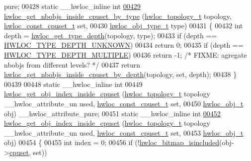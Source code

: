 \begin{DoxyCode}
      pure;
00428 \textcolor{keyword}{static} \_\_hwloc\_inline \textcolor{keywordtype}{int}
\hypertarget{a00031_source_l00429}{}\hyperlink{a00054_ga63481874c69ed257b1a0c03e7615ff97}{00429} \hyperlink{a00054_ga63481874c69ed257b1a0c03e7615ff97}{hwloc_get_nbobjs_inside_cpuset_by_type} (\hyperlink{a00039_ga9d1e76ee15a7dee158b786c30b6a6e38}{hwloc_topology_t} topology, 
      \hyperlink{a00040_ga1f784433e9b606261f62d1134f6a3b25}{hwloc_const_cpuset_t} \textcolor{keyword}{set},
00430                                         \hyperlink{a00041_gacd37bb612667dc437d66bfb175a8dc55}{hwloc_obj_type_t} type)
00431 \{
00432   \textcolor{keywordtype}{int} depth = \hyperlink{a00046_gaea7c64dd59467f5201ba87712710b14d}{hwloc_get_type_depth}(topology, type);
00433   \textcolor{keywordflow}{if} (depth == \hyperlink{a00046_ggaf4e663cf42bbe20756b849c6293ef575a0565ab92ab72cb0cec91e23003294aad}{HWLOC_TYPE_DEPTH_UNKNOWN})
00434     \textcolor{keywordflow}{return} 0;
00435   \textcolor{keywordflow}{if} (depth == \hyperlink{a00046_ggaf4e663cf42bbe20756b849c6293ef575ae99465995cacde6c210d5fc2e409798c}{HWLOC_TYPE_DEPTH_MULTIPLE})
00436     \textcolor{keywordflow}{return} -1; \textcolor{comment}{/* FIXME: agregate nbobjs from different levels? */}
00437   \textcolor{keywordflow}{return} \hyperlink{a00054_ga457604a2dedbf70ba3b480558666b56b}{hwloc_get_nbobjs_inside_cpuset_by_depth}(topology, \textcolor{keyword}{set}, depth);
00438 \}
00439 
00448 \textcolor{keyword}{static} \_\_hwloc\_inline \textcolor{keywordtype}{int}
00449 \hyperlink{a00054_ga7cdb6a4645e9b1ec80137e72d1736fdd}{hwloc_get_obj_index_inside_cpuset} (\hyperlink{a00039_ga9d1e76ee15a7dee158b786c30b6a6e38}{hwloc_topology_t} topology \_\_hwloc\_attribute\_un
      used, \hyperlink{a00040_ga1f784433e9b606261f62d1134f6a3b25}{hwloc_const_cpuset_t} \textcolor{keyword}{set},
00450                                    \hyperlink{a00016}{hwloc_obj_t} obj) \_\_hwloc\_attribute\_pure;
00451 \textcolor{keyword}{static} \_\_hwloc\_inline \textcolor{keywordtype}{int}
\hypertarget{a00031_source_l00452}{}\hyperlink{a00054_ga7cdb6a4645e9b1ec80137e72d1736fdd}{00452} \hyperlink{a00054_ga7cdb6a4645e9b1ec80137e72d1736fdd}{hwloc_get_obj_index_inside_cpuset} (\hyperlink{a00039_ga9d1e76ee15a7dee158b786c30b6a6e38}{hwloc_topology_t} topology \_\_hwloc\_attribute\_un
      used, \hyperlink{a00040_ga1f784433e9b606261f62d1134f6a3b25}{hwloc_const_cpuset_t} \textcolor{keyword}{set},
00453                                    \hyperlink{a00016}{hwloc_obj_t} obj)
00454 \{
00455   \textcolor{keywordtype}{int} index = 0;
00456   \textcolor{keywordflow}{if} (!\hyperlink{a00065_gaae29e14a926c198e8f91e6e4790621e7}{hwloc_bitmap_isincluded}(obj->\hyperlink{a00016_a67925e0f2c47f50408fbdb9bddd0790f}{cpuset}, \textcolor{keyword}{set}))

\end{DoxyCode}
